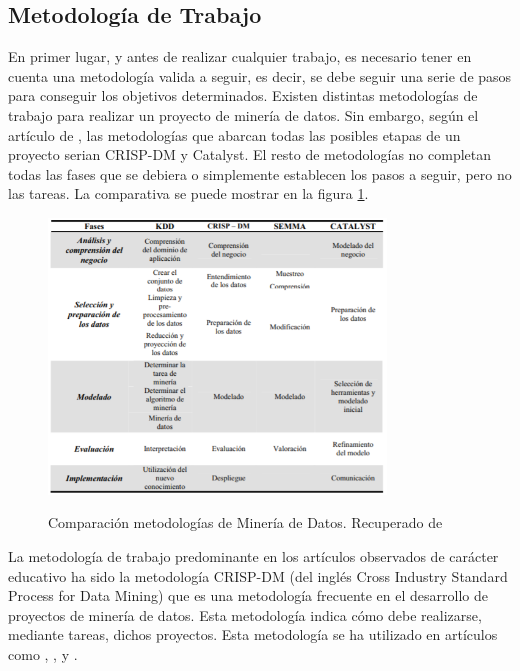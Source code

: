 \subsection{Metodología de Trabajo}
En primer lugar, y antes de realizar cualquier trabajo, es necesario tener en cuenta una metodología valida a seguir, es decir, se debe seguir una serie de pasos para conseguir los objetivos determinados. Existen distintas metodologías de trabajo para realizar un proyecto de minería de datos. Sin embargo, según el artículo de , las metodologías que abarcan todas las posibles etapas de un proyecto serian CRISP-DM y Catalyst. El resto de metodologías no completan todas las fases que se debiera o simplemente establecen los pasos a seguir, pero no las tareas. La comparativa se puede mostrar en la figura \ref{fig:compMod}.

\begin{figure}[htb]
	\centering
	\caption{
		Comparación metodologías de Minería de Datos. Recuperado de \protect{}
	}
	\includegraphics[width=0.8\textwidth]{recursos/ComparacionModelosDM}
	\label{fig:compMod}
\end{figure}
\FloatBarrier


La metodología de trabajo predominante en los artículos observados de carácter educativo ha sido la metodología CRISP-DM (del inglés Cross Industry Standard Process for Data Mining) que es una metodología frecuente en el desarrollo de proyectos de minería de datos. Esta metodología indica cómo debe realizarse, mediante tareas, dichos proyectos. Esta metodología se ha utilizado en artículos como , ,  y .

